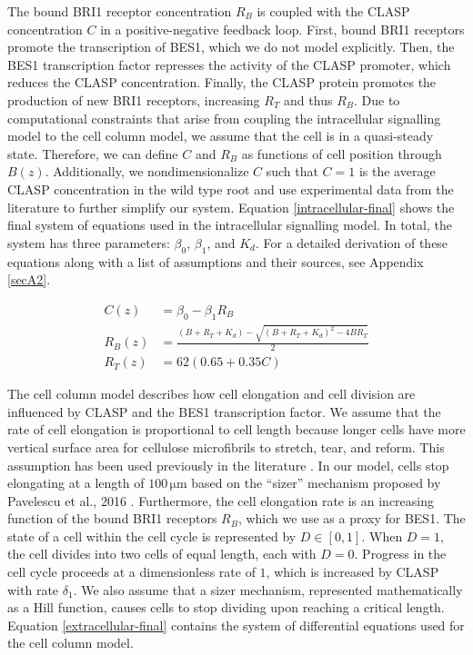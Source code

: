\documentclass[referee,pdflatex,sn-mathphys-num]{sn-jnl}
\newcommand{\um}{\,\unit{\micro\metre}}
\begin{document}
The bound BRI1 receptor concentration $R_{B}$ is coupled with the CLASP concentration $C$ in a positive-negative feedback loop.
First, bound BRI1 receptors promote the transcription of BES1, which we do not model explicitly.
Then, the BES1 transcription factor represses the activity of the CLASP promoter, which reduces the CLASP concentration.
Finally, the CLASP protein promotes the production of new BRI1 receptors, increasing $R_{T}$ and thus $R_{B}$.
Due to computational constraints that arise from coupling the intracellular signalling model to the cell column model, we assume that the cell is in a quasi-steady state. 
Therefore, we can define $C$ and $R_{B}$ as functions of cell position through $B(z)$.
Additionally, we nondimensionalize $C$ such that $C=1$ is the average CLASP concentration in the wild type root and use experimental data from the literature to further simplify our system.
Equation \ref{intracellular-final} shows the final system of equations used in the intracellular signalling model. 
In total, the system has three parameters: $\beta_{0}$, $\beta_{1}$, and $K_{d}$. 
For a detailed derivation of these equations along with a list of assumptions and their sources, see Appendix \ref{secA2}.

\begin{equation}
\label{intracellular-final}
\begin{aligned}
  C(z) &= \beta_{0} - \beta_{1}R_{B} \\[5pt]
  R_{B}(z) &= \frac{(B + R_{T} + K_{d}) - \sqrt{(B + R_{T} + K_{d})^{2} - 4BR_{T}}}{2} \\[5pt]
  R_{T}(z) &= 62 (0.65 + 0.35 C)
\end{aligned}
\end{equation}

The cell column model describes how cell elongation and cell division are influenced by CLASP and the BES1 transcription factor. 
We assume that the rate of cell elongation is proportional to cell length because longer cells have more vertical surface area for cellulose microfibrils to stretch, tear, and reform.
This assumption has been used previously in the literature \cite{lockhart1965}.
In our model, cells stop elongating at a length of $100\um$  based on the ``sizer'' mechanism proposed by Pavelescu et al., 2016 \cite{pavelescu2016}.
Furthermore, the cell elongation rate is an increasing function of the bound BRI1 receptors $R_{B}$, which we use as a proxy for BES1.
The state of a cell within the cell cycle is represented by $D \in [0, 1]$.  When $D = 1$, the cell divides into two cells of equal length, each with $D = 0$.
Progress in the cell cycle proceeds at a dimensionless rate of $1$, which is increased by CLASP with rate $\delta_{1}$. 
We also assume that a sizer mechanism, represented mathematically as a Hill function, causes cells to stop dividing upon reaching a critical length.
Equation \ref{extracellular-final} contains the system of differential equations used for the cell column model. 
\end{document}
